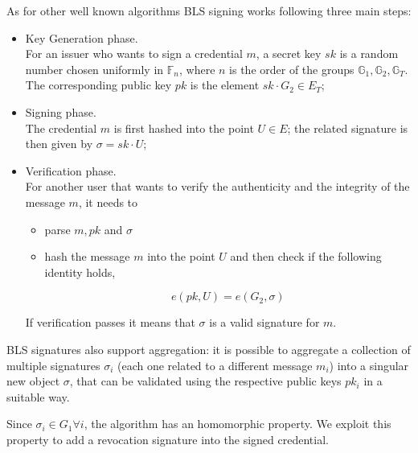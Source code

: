 As for other well known algorithms BLS signing works following three
main steps:
\begin{itemize}

\item Key Generation phase.\\ For an issuer who wants to sign a
  credential $m$, a secret key $sk$ is a random number chosen
  uniformly in $\mathbb{F}_n$, where $n$ is the order of the groups
  $\mathbb{G}_1, \mathbb{G}_2, \mathbb{G}_T$. The corresponding public
  key $pk$ is the element $sk\cdot G_2\in E_T$;

\item Signing phase.\\ The credential $m$ is first hashed into the
  point $U\in E$; the related signature is then given by $\sigma =
  sk\cdot U$;

\item Verification phase.\\ For another user that wants to verify the
  authenticity and the integrity of the message $m$, it needs to

  \begin{itemize}

  \item [1.] parse $m, pk$ and $\sigma$

  \item [2.] hash the message $m$ into the point $U$ and then
    check if the following identity holds,

    \[
    e(pk,U) = e(G_2,\sigma)
    \]

  \end{itemize}
If verification passes it means that $\sigma$ is a valid signature for
$m$.
\end{itemize}

BLS signatures also support aggregation: it is possible to aggregate a
collection of multiple signatures $\sigma_i$ (each one related to a
different message $m_i$) into a singular new object $\sigma$, that can
be validated using the respective public keys $pk_i$ in a suitable
way.

Since $\sigma_i\in G_1 \forall i$, the algorithm has an homomorphic
property. We exploit this property to add a revocation signature into
the signed credential.

